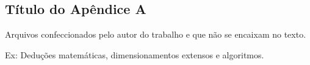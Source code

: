 \begin{apendicesenv}

\chapter{Título do Apêndice A}

Arquivos confeccionados pelo autor do trabalho e que não se encaixam no texto.

 Ex: Deduções matemáticas, dimensionamentos extensos e algoritmos.

\end{apendicesenv}